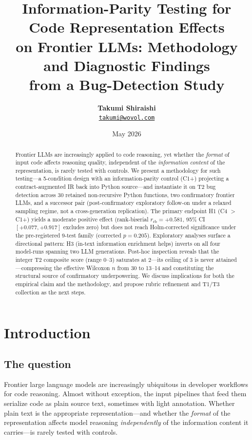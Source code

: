 \documentclass[11pt]{article}
\title{Information-Parity Testing for Code Representation Effects \\
       on Frontier LLMs: Methodology and Diagnostic Findings \\
       from a Bug-Detection Study}
\author{%
  \textbf{\large Takumi Shiraishi} \\[2pt]
  \href{mailto:takumi@wovol.com}{\texttt{takumi@wovol.com}}
}
\date{May 2026}
\begin{document}
\maketitle

\begin{abstract}
Frontier LLMs are increasingly applied to code reasoning, yet whether the
\emph{format} of input code affects reasoning quality, independent of the
\emph{information content} of the representation, is rarely tested with
controls. We present a methodology for such testing---a 5-condition design
with an information-parity control (C1+) projecting a contract-augmented IR
back into Python source---and instantiate it on T2 bug detection across 30
retained non-recursive Python functions, two confirmatory frontier LLMs, and
a successor pair (post-confirmatory exploratory follow-on under a
relaxed sampling regime, not a cross-generation replication). The primary
endpoint H1 (C4 $>$ C1+) yields a moderate positive effect (rank-biserial
$r_{\text{rb}} = +0.581$, 95\% CI $[+0.077, +0.917]$ excludes zero) but does
not reach Holm-corrected significance under the pre-registered 9-test family
(corrected $p = 0.205$). Exploratory analyses surface a directional pattern:
H3 (in-text information enrichment helps) inverts on all four model-runs
spanning two LLM generations. Post-hoc inspection reveals that the integer
T2 composite score (range $0$--$3$) saturates at $2$---its ceiling of $3$ is
never attained---compressing the effective Wilcoxon $n$ from 30 to 13--14
and constituting the structural source of confirmatory underpowering. We discuss implications for both the empirical claim and the
methodology, and propose rubric refinement and T1/T3 collection as the next
steps.
\end{abstract}

\clearpage
\tableofcontents
\clearpage

\section{Introduction}
\label{sec:1}

\subsection{The question}
\label{sec:1.1}
Frontier large language models are increasingly ubiquitous in
developer workflows for code reasoning. Almost without exception,
the input pipelines that feed them serialize code as plain source
text, sometimes with light annotation. Whether plain text is the
appropriate representation---and whether the \emph{format} of the
representation affects model reasoning \emph{independently} of
the information content it carries---is rarely tested with
controls.
\end{document}

